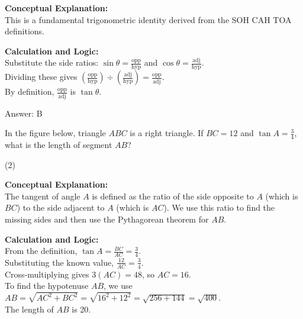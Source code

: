 \documentclass[11pt,paper=a4,answers]{exam}
\begin{document}
\begin{questions}
\begin{solution}
\textbf{Conceptual Explanation:} \\
This is a fundamental trigonometric identity derived from the SOH CAH TOA definitions.

\vspace{10pt}
\textbf{Calculation and Logic:} \\
Substitute the side ratios: $\sin \theta = \frac{\text{opp}}{\text{hyp}}$ and $\cos \theta = \frac{\text{adj}}{\text{hyp}}$. \\
Dividing these gives $(\frac{\text{opp}}{\text{hyp}}) \div (\frac{\text{adj}}{\text{hyp}}) = \frac{\text{opp}}{\text{adj}}$. \\
By definition, $\frac{\text{opp}}{\text{adj}}$ is $\tan \theta$.

\vspace{15pt}
Answer: \colorbox{yellow!100}{B}
\end{solution}



\question
In the figure below, triangle $ABC$ is a right triangle. If $BC = 12$ and $\tan A = \frac{3}{4}$, what is the length of segment $AB$?
\begin{center}
\end{center}
\begin{tasks}(2)
\end{tasks}

\begin{solution}
\textbf{Conceptual Explanation:} \\
The tangent of angle $A$ is defined as the ratio of the side opposite to $A$ (which is $BC$) to the side adjacent to $A$ (which is $AC$). We use this ratio to find the missing sides and then use the Pythagorean theorem for $AB$.

\vspace{10pt}
\textbf{Calculation and Logic:} \\
From the definition, $\tan A = \frac{BC}{AC} = \frac{3}{4}$. \\
Substituting the known value, $\frac{12}{AC} = \frac{3}{4}$. \\
Cross-multiplying gives $3(AC) = 48$, so $AC = 16$. \\
To find the hypotenuse $AB$, we use $AB = \sqrt{AC^2 + BC^2} = \sqrt{16^2 + 12^2} = \sqrt{256 + 144} = \sqrt{400}$. \\
The length of $AB$ is 20.


\end{solution}
\end{questions}
\end{document}
